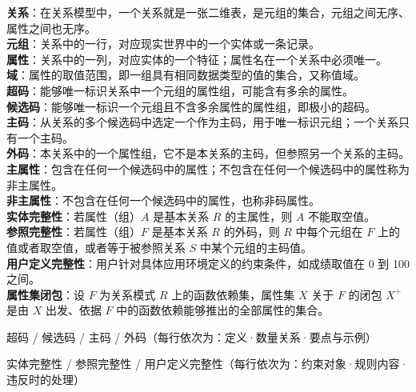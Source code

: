 \documentclass[a4paper,11pt]{article}
\begin{document}
\begin{keyterms}
\textbf{关系}：在关系模型中，一个关系就是一张二维表，是元组的集合，元组之间无序、属性之间也无序。\\
\textbf{元组}：关系中的一行，对应现实世界中的一个实体或一条记录。\\
\textbf{属性}：关系中的一列，对应实体的一个特征；属性名在一个关系中必须唯一。\\
\textbf{域}：属性的取值范围，即一组具有相同数据类型的值的集合，又称值域。\\
\textbf{超码}：能够唯一标识关系中一个元组的属性组，可能含有多余的属性。\\
\textbf{候选码}：能够唯一标识一个元组且不含多余属性的属性组，即极小的超码。\\
\textbf{主码}：从关系的多个候选码中选定一个作为主码，用于唯一标识元组；一个关系只有一个主码。\\
\textbf{外码}：本关系中的一个属性组，它不是本关系的主码，但参照另一个关系的主码。\\
\textbf{主属性}：包含在任何一个候选码中的属性；不包含在任何一个候选码中的属性称为非主属性。\\
\textbf{非主属性}：不包含在任何一个候选码中的属性，也称非码属性。\\
\textbf{实体完整性}：若属性（组）$A$ 是基本关系 $R$ 的主属性，则 $A$ 不能取空值。\\
\textbf{参照完整性}：若属性（组）$F$ 是基本关系 $R$ 的外码，则 $R$ 中每个元组在 $F$ 上的值或者取空值，或者等于被参照关系 $S$ 中某个元组的主码值。\\
\textbf{用户定义完整性}：用户针对具体应用环境定义的约束条件，如成绩取值在 0 到 100 之间。\\
\textbf{属性集闭包}：设 $F$ 为关系模式 $R$ 上的函数依赖集，属性集 $X$ 关于 $F$ 的闭包 $X^{+}$ 是由 $X$ 出发、依据 $F$ 中的函数依赖能够推出的全部属性的集合。
\end{keyterms}

\begin{contrast}{超码 / 候选码 / 主码 / 外码（每行依次为：定义·数量关系·要点与示例）}
\end{contrast}

\begin{contrast}{实体完整性 / 参照完整性 / 用户定义完整性（每行依次为：约束对象·规则内容·违反时的处理）}
\end{contrast}
\end{document}
